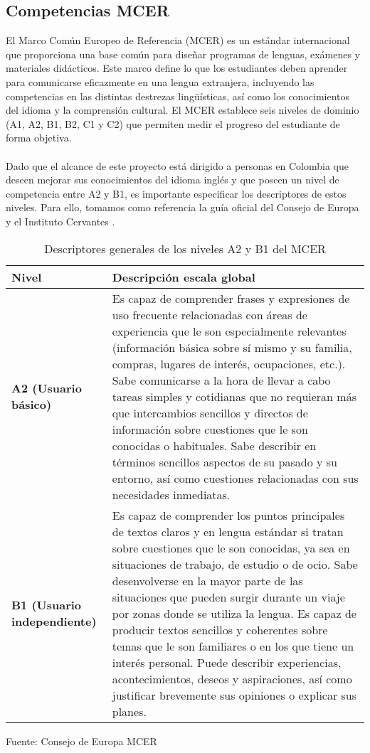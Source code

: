 \subsection{Competencias MCER}

El Marco Común Europeo de Referencia (MCER) es un estándar internacional que proporciona una base común para diseñar programas de lenguas, exámenes y materiales didácticos. Este marco define lo que los estudiantes deben aprender para comunicarse eficazmente en una lengua extranjera, incluyendo las competencias en las distintas destrezas lingüísticas, así como los conocimientos del idioma y la comprensión cultural. El MCER establece seis niveles de dominio (A1, A2, B1, B2, C1 y C2) que permiten medir el progreso del estudiante de forma objetiva.
\\
\\
Dado que el alcance de este proyecto está dirigido a personas en Colombia que deseen mejorar sus conocimientos del idioma inglés y que poseen un nivel de competencia entre A2 y B1, es importante especificar los descriptores de estos niveles. Para ello, tomamos como referencia la guía oficial del Consejo de Europa y el Instituto Cervantes \cite{mcer2002}.

\begin{table}[H]
\centering
\small
\begin{tabular}{|p{4cm}|p{10cm}|}
\hline
\textbf{Nivel} & \textbf{Descripción  escala global} \\
\hline
\textbf{A2 (Usuario básico)} & Es capaz de comprender frases y expresiones de uso frecuente relacionadas con áreas de experiencia que le son especialmente relevantes (información básica sobre sí mismo y su familia, compras, lugares de interés, ocupaciones, etc.). Sabe comunicarse a la hora de llevar a cabo tareas simples y cotidianas que no requieran más que intercambios sencillos y directos de información sobre cuestiones que le son conocidas o habituales. Sabe describir en términos sencillos aspectos de su pasado y su entorno, así como cuestiones relacionadas con sus necesidades inmediatas. \\
\hline
\textbf{B1 (Usuario independiente)} & Es capaz de comprender los puntos principales de textos claros y en lengua estándar si tratan sobre cuestiones que le son conocidas, ya sea en situaciones de trabajo, de estudio o de ocio. Sabe desenvolverse en la mayor parte de las situaciones que pueden surgir durante un viaje por zonas donde se utiliza la lengua. Es capaz de producir textos sencillos y coherentes sobre temas que le son familiares o en los que tiene un interés personal. Puede describir experiencias, acontecimientos, deseos y aspiraciones, así como justificar brevemente sus opiniones o explicar sus planes. \\
\hline
\end{tabular}
\caption{Descriptores generales de los niveles A2 y B1 del MCER}
Fuente: Consejo de Europa MCER \cite{mcer2002}
\label{tab:descriptores-mcer}
\end{table}

